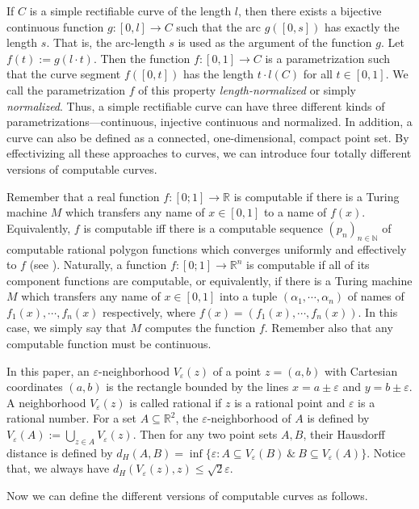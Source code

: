 \documentclass{LMCS}
\theoremstyle{plain}
\def\IN{\mathbb{N}}
\def\IR{\mathbb{R}}
\begin{document}
If $C$ is a simple rectifiable curve of the length $l$, then there exists a bijective continuous function $g:[0, l] \to C$ such that the arc $g([0, s])$ has exactly the length $s$. That is, the arc-length $s$ is used as the argument of the function $g$. Let $f(t) := g(l\cdot t)$. Then the function $f:[0,1]\to C$ is a parametrization such that the curve segment $f([0, t])$ has the length $t\cdot l(C)$ for all $t\in[0,1]$. We call the parametrization $f$ of this property {\em length-normalized} or simply {\em normalized}.  Thus, a simple rectifiable curve can have three different kinds of parametrizations---continuous, injective continuous and normalized. In addition, a curve can also be defined as a connected, one-dimensional, compact point set. By effectivizing  all these approaches to curves, we can introduce four totally different versions of computable curves.

Remember that a real function $f:[0; 1] \to \IR$ is computable if there is a Turing machine $M$ which transfers any name of $x\in[0,1]$ to a name of $f(x)$.  Equivalently, $f$ is computable iff there is a computable sequence $(p_n)_{n\in\IN}$ of computable rational polygon functions which converges uniformly and effectively to $f$ (see \cite{PR89}). Naturally, a function $f:[0;1] \to \IR^n$ is computable if all of its component functions are computable, or equivalently, if there is a Turing machine $M$ which transfers any name of $x\in [0,1]$ into a tuple $(\alpha_1, \cdots, \alpha_n)$ of names of $f_1(x), \cdots, f_n(x)$ respectively, where $f(x) = (f_1(x), \cdots, f_n(x))$. In this case, we simply say that $M$ computes the function $f$. Remember also that any computable function must be continuous.

In this paper, an $\varepsilon$-neighborhood $V_\varepsilon(z)$ of a point $z=(a,b)$ with Cartesian coordinates $(a,b)$ is the rectangle bounded by the lines $x= a \pm \varepsilon$ and $y = b\pm \varepsilon$. A neighborhood $V_\varepsilon(z)$ is called rational if $z$ is a rational point and $\varepsilon$ is a rational number. For a set $A \subseteq \IR^2$, the $\varepsilon$-neighborhood of $A$ is defined by $V_\varepsilon (A) := \bigcup_{z \in A} V_\varepsilon(z)$. Then for any two point sets $A, B$, their Hausdorff distance is defined by $d_H(A, B) = \inf \{ \varepsilon: A \subseteq V_\varepsilon(B) \ \&\ B \subseteq V_\varepsilon(A)\}$. Notice that, we  always have $d_H(V_\varepsilon(z), z) \le \sqrt{2}\varepsilon$.

Now we can define the different versions of computable curves as follows.
\end{document}
